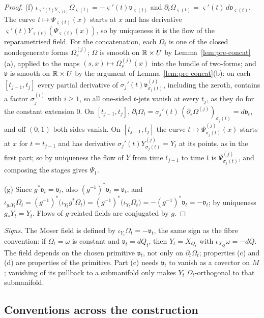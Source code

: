 \begin{proof}
(f) $\iota_{\varsigma'(t)Y_{\varsigma(t)}}\Omega_{\varsigma(t)}=-\varsigma'(t)\mathfrak v_{\varsigma(t)}$ and $\partial_t\Omega_{\varsigma(t)}=\varsigma'(t)\,d\mathfrak v_{\varsigma(t)}$.
The curve $t\mapsto\Psi_{\varsigma(t)}(x)$ starts at $x$ and has derivative $\varsigma'(t)Y_{\varsigma(t)}(\Psi_{\varsigma(t)}(x))$, so by
uniqueness it is the flow of the reparametrised field. For the concatenation, each $\Omega_t$ is one of the closed
nondegenerate forms $\Omega^{(j)}_s$; $\Omega$ is smooth on $\mathbb{R}\times U$ by Lemma~\ref{lem:pre-concat}(a), applied to the maps
$(s,x)\mapsto\Omega^{(j)}_s(x)$ into the bundle of two-forms; and $\mathfrak v$ is smooth on $\mathbb{R}\times U$ by the argument of
Lemma~\ref{lem:pre-concat}(b): on each $[t_{j-1},t_j]$ every partial derivative of $\sigma_j'(t)\mathfrak v^{(j)}_{\sigma_j(t)}$, including
the zeroth, contains a factor $\sigma_j^{(i)}$ with $i\ge1$, so all one-sided $t$-jets vanish at every $t_j$, as they do for
the constant extension $0$. On $[t_{j-1},t_j]$, $\partial_t\Omega_t=\sigma_j'(t)\,(\partial_s\Omega^{(j)})_{\sigma_j(t)}=d\mathfrak v_t$, and off
$(0,1)$ both sides vanish. On $[t_{j-1},t_j]$ the curve $t\mapsto\Psi^{(j)}_{\sigma_j(t)}(x)$ starts at $x$ for $t=t_{j-1}$ and has derivative
$\sigma_j'(t)Y^{(j)}_{\sigma_j(t)}=Y_t$ at its points, as in the first part; so by uniqueness the flow of $Y$ from time $t_{j-1}$
to time $t$ is $\Psi^{(j)}_{\sigma_j(t)}$, and composing the stages gives $\Psi_1$.

(g) Since $g^*\mathfrak v_t=\mathfrak v_t$, also $(g^{-1})^*\mathfrak v_t=\mathfrak v_t$, and
$\iota_{g_*Y_t}\Omega_t=(g^{-1})^*\big(\iota_{Y_t}g^*\Omega_t\big)=(g^{-1})^*\big(\iota_{Y_t}\Omega_t\big)=-(g^{-1})^*\mathfrak v_t=-\mathfrak v_t$;
by uniqueness $g_*Y_t=Y_t$. Flows of $g$-related fields are conjugated by $g$.
\end{proof}

\emph{Signs.} The Moser field is defined by $\iota_{Y_t}\Omega_t=-\mathfrak v_t$, the same sign as the fibre convention: if
$\Omega_t=\omega$ is constant and $\mathfrak v_t=dQ_t$, then $Y_t=X_{Q_t}$ with $\iota_{X_Q}\omega=-dQ$. The field depends on the
chosen primitive $\mathfrak v_t$, not only on $\partial_t\Omega_t$; properties (c) and (d) are properties of the primitive.
Part (c) needs $\mathfrak v_t$ to vanish as a covector on $M$; vanishing of its pullback to a submanifold only makes
$Y_t$ $\Omega_t$-orthogonal to that submanifold.

\subsection{Conventions across the construction}\label{sec:pre-unified}

